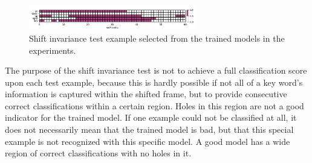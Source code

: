\begin{figure}[!ht]
  \centering
    \includegraphics[width=0.65\textwidth]{./5_exp/figs/exp_fs_cepstral_tb_shift_conv-jim_mfcc12_norm0.png}
  \caption{Shift invariance test example selected from the trained models in the experiments.}
  \label{fig:exp_details_tb_shift}
\end{figure}
\FloatBarrier
\noindent
The purpose of the shift invariance test is not to achieve a full classification score upon each test example, because this is hardly possible if not all of a key word's information is captured within the shifted frame, but to provide consecutive correct classifications within a certain region.
Holes in this region are not a good indicator for the trained model.
If one example could not be classified at all, it does not necessarily mean that the trained model is bad, but that this special example is not recognized with this specific model.
A good model has a wide region of correct classifications with no holes in it.



